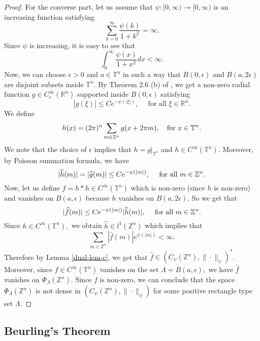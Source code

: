 \documentclass [11pt]{amsart}
\newcommand{\R}{\mathbb R}
\newcommand{\T}{\mathbb T}
\newcommand{\Z}{\mathbb Z}
\newcommand{\txt} {\textmd}
\newcommand{\ds} {\displaystyle}
\newcommand{\bes} {\begin{equation*}}
\newcommand{\ees} {\end{equation*}}
\numberwithin{equation}{section}
\begin{document}
\begin{proof}
For the converse part, let us assume that $\psi:[0,\infty) \rightarrow [0,\infty)$ is an increasing function satisfying 
\bes \sum_{k=0}^\infty\dfrac{\psi(k)}{1+k^2} = \infty. \ees 
Since $\psi$ is increasing, it is easy to see that \bes \int_0^{\infty}\dfrac{\psi(x)}{1+x^2}dx<\infty. \ees 
Now, we can choose $\epsilon>0$ and $a \in \T^n$ in such a way that $B(0,\epsilon)$ and $B(a,2\epsilon)$ are disjoint subsets inside $\T^n.$
By Theorem 2.6 (b) of \cite{BRS}, we get a non-zero radial function $g\in C_c^\infty(\R^n)$ supported inside $B(0,\epsilon)$  satisfying 
$$|\widehat{g}(\xi)|\leq Ce^{-\psi(|\xi|)}, \quad \text{ for all } \xi \in \R^n.$$ 
 We define  
$$h(x)= (2 \pi)^n \sum_{m\in \Z^n}g(x+ 2 \pi m), \quad \txt{for } x\in \T^n.$$ 
We note that the choice of $\epsilon$ implies that $h=g|_{\T^n}$ and $h\in C^\infty(\T^n).$ Moreover, by Poisson summation formula, we have
$$|\widehat{h}(m)|=|\widehat{g}(m)|\leq Ce^{-\psi(|m|)}, \quad \txt{ for all } m\in \Z^n.$$
Now, let us define $f=h*h \in C^\infty(\T^n)$ which is non-zero (since $h$ is non-zero) and vanishes on $B(a,\epsilon)$ because $h$ vanishes on $B(a,2\epsilon).$ So we get that 
$$ |\widehat{f}(m)|\leq Ce^{-\psi(|m|)}|\widehat{h}(m)|, \quad \txt{ for all } m\in \Z^n.$$
Since $h\in C^\infty(\T^n),$ we obtain $\widehat{h} \in l^1(\Z^n)$ which implies that 
$$\ds{\sum_{m\in \Z^n}|\widehat{f}(m)|e^{\psi(|m|)}<\infty.}$$
Therefore by Lemma \ref{dual-lem-c}, we get that $\widehat{f}\in (C_\psi(\Z^n),\|\cdot\|_\psi)^*.$ 
Moreover, since $f \in C^\infty(\T^n)$ vanishes on the set $\Lambda=B (a,\epsilon),$ we have $\widehat{f}$ vanishes on $\Phi_\Lambda(\Z^n).$ Since $f$ is non-zero, we can conclude that the space $\Phi_\Lambda(\Z^n)$ is not dense in $(C_\psi(\Z^n),\|\cdot\|_\psi)$ for some positive rectangle type
set $\Lambda.$
\end{proof}

\subsection{Beurling's Theorem}
\end{document}
